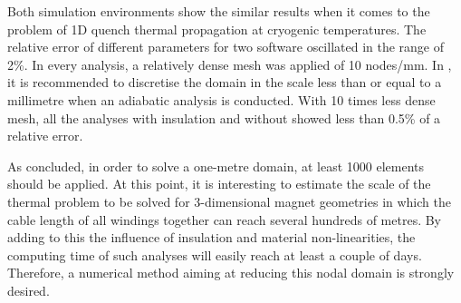 
Both simulation environments show the similar results when it comes to the problem of 1D quench thermal propagation at cryogenic temperatures. The relative error of different parameters for two software oscillated in the range of 2\%. In every analysis, a relatively dense mesh was applied of 10 nodes/mm. In  \cite{paudel_thesis}, it is recommended to discretise the domain in the scale less than or equal to a millimetre when an adiabatic analysis is conducted. 
With 10 times less dense mesh, all the analyses with insulation and without showed less than 0.5\% of a relative error. 

As concluded, in order to solve a one-metre domain, at least 1000 elements should be applied. At this point, it is interesting to estimate the scale of the thermal problem to be solved for 3-dimensional magnet geometries in which the cable length of all windings together can reach several hundreds of metres. By adding to this the influence of insulation and material non-linearities, the computing time of such analyses will easily reach at least a couple of days. Therefore, a numerical method aiming at reducing this nodal domain is strongly desired.
